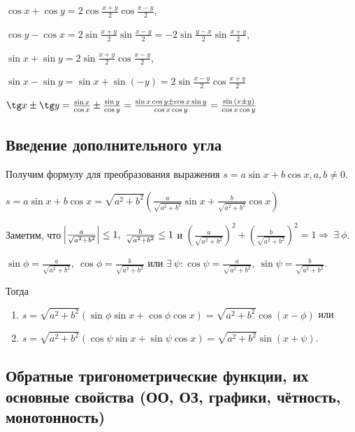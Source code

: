 \documentclass{article}
\begin{document}
        \(\cos x + \cos y = 2 \cos{\frac{x + y}{2}} \cos{\frac{x - y}{2}}\),
        
        \(\cos y - \cos x = 2 \sin{\frac{x + y}{2}} \sin{\frac{x - y}{2}} = -2 \sin{\frac{y - x}{2}} \sin{\frac{x + y}{2}}\),
        
        \(\sin x + \sin y = 2 \sin{\frac{x + y}{2}} \cos{\frac{x - y}{2}}\),
        
        \(\sin x - \sin y = \sin x + \sin{(-y)} = 2 \sin{\frac{x - y}{2}} \cos{\frac{x + y}{2}}\)
        
        \(\tg x \pm \tg y = \frac{\sin x}{\cos x} \pm \frac{\sin y}{\cos y} = \frac{\sin x \cos y \pm \cos x \sin y}{\cos x \cos y} = \frac{\sin{(x \pm y)}}{\cos x \cos y}\)
        
        \subsection{Введение дополнительного угла}
        
        Получим формулу для преобразования выражения \(s = a \sin x + b \cos x, a, b \not = 0\).
        
        \(s = a \sin x + b \cos x = \sqrt{a^2 + b^2}(\frac{a}{\sqrt{a^2 + b^2}} \sin x + \frac{b}{\sqrt{a^2 + b^2}} \cos x)\)
        
        Заметим, что \(\abs{\frac{a}{\sqrt{a^2 + b^2}}} \leq 1,\ \frac{b}{\sqrt{a^2 + b^2}} \leq 1\) и \((\frac{a}{\sqrt{a^2 + b^2}})^2 + (\frac{b}{\sqrt{a^2 + b^2}})^2 = 1 \Rightarrow\ \exists\ \phi\).
        
        \(\sin{\phi} = \frac{a}{\sqrt{a^2 + b^2}},\ \cos{\phi} = \frac{b}{\sqrt{a^2 + b^2}}\) или \(\exists\ \psi : \cos{\psi} = \frac{a}{\sqrt{a^2 + b^2}},\ \sin{\psi} = \frac{b}{\sqrt{a^2 + b^2}}\).
        
        Тогда \begin{enumerate}
        	\item \(s = \sqrt{a^2 + b^2}(\sin{\phi} \sin x + \cos{\phi} \cos x) = \sqrt{a^2 + b^2} \cos{(x - \phi)}\) или
            \item \(s = \sqrt{a^2 + b^2}(\cos{\psi} \sin x + \sin{\psi} \cos x) = \sqrt{a^2 + b^2} \sin{(x + \psi)}\).
        \end{enumerate}
        
        \subsection{Обратные тригонометрические функции, их основные свойства (ОО, ОЗ, графики, чётность, монотонность)}
        
\end{document}
